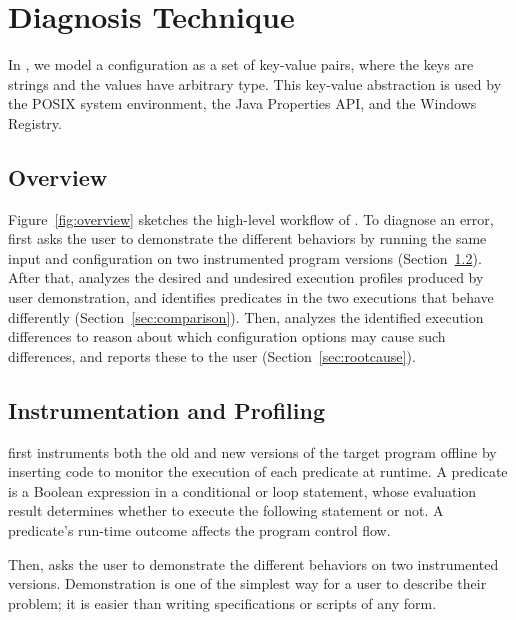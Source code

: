 
\section{Diagnosis Technique}
\label{sec:technique}

In \ourtool, we model a configuration as a set of key-value
pairs, where the keys are strings and the values have
arbitrary type. 
This key-value abstraction
is used by the POSIX system environment, the Java
Properties API, and the Windows Registry.

\subsection{Overview}

Figure~\ref{fig:overview} sketches the high-level workflow of
\ourtool. To diagnose an error, \ourtool first asks the user to demonstrate
the different behaviors by running the same input and
configuration on two instrumented program versions (Section~\ref{sec:profiling}). 
After that, \ourtool analyzes the desired and undesired
execution profiles produced by user demonstration, and identifies
predicates in the two executions that behave differently (Section~\ref{sec:comparison}).
Then, \ourtool analyzes the identified execution differences
to reason about which configuration options may cause such differences,
and reports these to the user (Section~\ref{sec:rootcause}).

\subsection{Instrumentation and Profiling}
\label{sec:profiling}

\ourtool first instruments both the old and new versions
of the target program offline by inserting code to monitor
the execution of each predicate at runtime. A predicate
is a Boolean expression in a conditional or loop statement,
whose evaluation result determines whether to execute the
following statement or not. A predicate's run-time outcome
affects the program control flow. 

Then, \ourtool asks the user to demonstrate the different
behaviors on two instrumented versions. Demonstration is
one of the simplest way for a user to describe their problem;
it is easier than writing specifications or scripts of any form.

